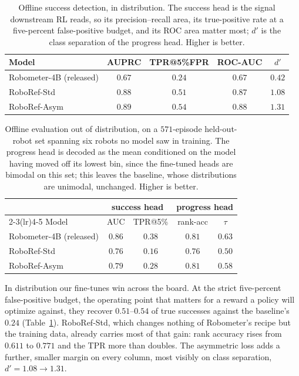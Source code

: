\begin{table}[t]
\centering\footnotesize
\caption{Offline success detection, in distribution. The success head is the
signal downstream RL reads, so its precision--recall area, its true-positive rate
at a five-percent false-positive budget, and its ROC area matter most; $d'$ is
the class separation of the progress head. Higher is better.}
\label{tab:offline-id-succ}
\begin{tabular}{@{}lcccc@{}}
\toprule
Model & AUPRC & TPR@5\%FPR & ROC-AUC & $d'$ \\
\midrule
Robometer-4B (released) & $0.67$ & $0.24$ & $0.67$ & $0.42$ \\
RoboRef-Std             & $0.88$ & $0.51$ & $0.87$ & $1.08$ \\
RoboRef-Asym            & $\mathbf{0.89}$ & $\mathbf{0.54}$ & $\mathbf{0.88}$ & $\mathbf{1.31}$ \\
\bottomrule
\end{tabular}
\end{table}

\begin{table}[t]
\centering\footnotesize
\setlength{\tabcolsep}{4pt}
\caption{Offline evaluation out of distribution, on a $571$-episode
held-out-robot set spanning six robots no model saw in training. The progress
head is decoded as the mean conditioned on the model having moved off its lowest
bin, since the fine-tuned heads are bimodal on this set; this leaves the
baseline, whose distributions are unimodal, unchanged. Higher is better.}
\label{tab:offline-ood}
\begin{tabular}{@{}lcccc@{}}
\toprule
 & \multicolumn{2}{c}{success head} & \multicolumn{2}{c}{progress head} \\
\cmidrule(lr){2-3}\cmidrule(lr){4-5}
Model & AUC & TPR@5\% & rank-acc & $\tau$ \\
\midrule
Robometer-4B (released) & $\mathbf{0.86}$ & $\mathbf{0.38}$ & $\mathbf{0.81}$ & $\mathbf{0.63}$ \\
RoboRef-Std             & $0.76$ & $0.16$ & $0.76$ & $0.50$ \\
RoboRef-Asym            & $0.79$ & $0.28$ & $\mathbf{0.81}$ & $0.58$ \\
\bottomrule
\end{tabular}
\end{table}

In distribution our fine-tunes win across the board. At the strict five-percent
false-positive budget, the operating point that matters for a reward a policy
will optimize against, they recover $0.51$--$0.54$ of true successes against the
baseline's $0.24$ (Table~\ref{tab:offline-id-succ}). RoboRef-Std, which changes
nothing of Robometer's recipe but the training data, already carries most of that
gain: rank accuracy rises from $0.611$ to $0.771$ and the TPR more than doubles.
The asymmetric loss adds a further, smaller margin on every column, most visibly
on class separation, $d' = 1.08 \to 1.31$.

